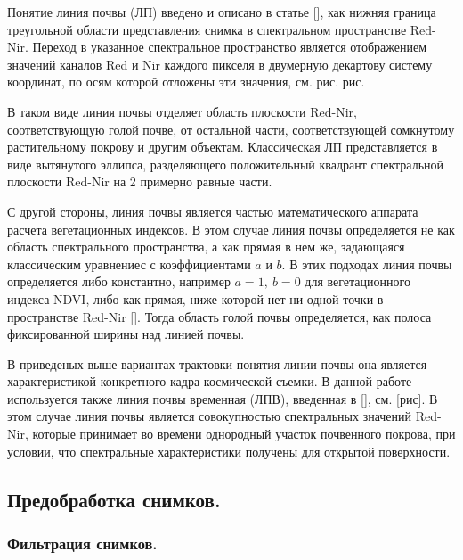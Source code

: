 \documentclass[12pt]{article}
\begin{document}
\par
Понятие линия почвы (ЛП) введено и описано в статье {\color{red} []}, как нижняя граница
треугольной области представления снимка в спектральном пространстве Red-Nir.
Переход в указанное спектральное пространство является отображением значений каналов Red и Nir
каждого пикселя в двумерную декартову систему координат, по осям которой отложены эти значения,
см. рис. {\color{red} рис}.
\par
В таком виде линия почвы отделяет область плоскости Red-Nir, соответствующую голой почве, от
остальной части, соответствующей сомкнутому растительному покрову и другим объектам.
Классическая ЛП представляется в виде вытянутого эллипса, разделяющего положительный квадрант
спектральной плоскости Red-Nir на 2 примерно равные части.
\par
С другой стороны, линия почвы является частью математического аппарата расчета
вегетационных индексов. В этом случае линия почвы определяется не как область спектрального
пространства, а как прямая в нем же, задающаяся классическим уравнениес с коэффициентами
$a$ и $b$. В этих подходах линия почвы определяется либо константно, например 
$a=1,\ b=0$ для вегетационного индекса NDVI, либо как прямая, ниже которой нет ни 
одной точки в пространстве Red-Nir {\color{red} []}. Тогда область голой почвы
определяется, как полоса фиксированной ширины над линией почвы.
\par
В приведеных выше вариантах трактовки понятия линии почвы она является характеристикой
конкретного кадра космической съемки. В данной работе используется также линия почвы 
временная (ЛПВ), введенная в {\color{red} []}, см. {\color{red} [рис]}. 
В этом случае линия почвы является совокупностью спектральных значений Red-Nir,
которые принимает во времени однородный участок почвенного покрова, при условии, что
спектральные характеристики получены для открытой поверхности.

\subsection{Предобработка снимков.}

\subsubsection{Фильтрация снимков.}
\end{document}
